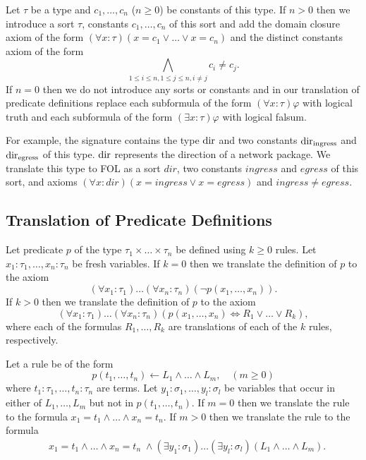 Let $\tau$ be a type and $c_1,\ldots,c_n$ ($n\ge0$) be constants of this type. If $n>0$ then we introduce a sort $\tau$, constants $c_1,\ldots,c_n$ of this sort and add the domain closure axiom of the form $(\forall x:\tau)(x=c_1 \vee\ldots\vee x=c_n)$ and the distinct constants axiom of the form $$\bigwedge_{1\le i\le n,1\le j\le n,i\not=j}c_i\not=c_j.$$ If $n=0$ then we do not introduce any sorts or constants and in our translation of predicate definitions replace each subformula of the form $(\forall x:\tau)\varphi$ with logical truth and each subformula of the form $(\exists x:\tau)\varphi$ with logical falsum.

For example, the signature contains the type $\mathrm{dir}$ and two constants $\mathrm{dir}_\text{ingress}$ and $\mathrm{dir}_\text{egress}$ of this type. $\mathrm{dir}$ represents the direction of a network package. We translate this type to FOL as a sort $\mathit{dir}$, two constants $\mathit{ingress}$ and $\mathit{egress}$ of this sort, and axioms $(\forall x:\mathit{dir})(x=\mathit{ingress}\vee x=\mathit{egress})$ and $\mathit{ingress}\neq\mathit{egress}$.


\subsection{Translation of Predicate Definitions}\label{sect:aws/fol/predicates}


Let predicate $p$ of the type $\tau_1\times\ldots\times\tau_n$ be defined using $k\ge0$ rules. Let $x_1:\tau_1,\ldots,x_n:\tau_n$ be fresh variables. If $k=0$ then we translate the definition of $p$ to the axiom $$(\forall x_1:\tau_1)\ldots(\forall x_n:\tau_n)(\neg p(x_1,\ldots,x_n)).$$ If $k>0$ then we translate the definition of $p$ to the axiom $$(\forall x_1:\tau_1)\ldots(\forall x_n:\tau_n)(p(x_1,\ldots,x_n)\Leftrightarrow R_1\vee\ldots\vee R_k),$$ where each of the formulas $R_1,\ldots,R_k$ are translations of each of the $k$ rules, respectively.

Let a rule be of the form $$p(t_1,\ldots,t_n)\leftarrow L_1\wedge\ldots\wedge L_m, \quad(m\ge0)$$ where $t_1:\tau_1,\ldots,t_n:\tau_n$ are terms. Let $y_1:\sigma_1,\ldots,y_l:\sigma_l$ be variables that occur in either of $L_1,\ldots,L_m$ but not in $p(t_1,\ldots,t_n)$. If $m=0$ then we translate the rule to the formula $x_1=t_1\wedge\ldots\wedge x_n=t_n.$ If $m>0$ then we translate the rule to the formula
\begin{equation*}
\begin{aligned}
&x_1=t_1\wedge\ldots\wedge x_n=t_n\;\wedge(\exists y_1:\sigma_1)\ldots(\exists y_l:\sigma_l)(L_1\wedge\ldots\wedge L_m).
\end{aligned}
\end{equation*}

